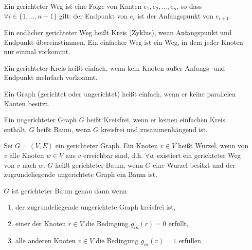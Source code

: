 \begin{definition}
	
	Ein gerichteter Weg ist eine Folge von Kanten $e_1, e_2, \dots, e_n$, so dass $\forall i \in \{ 1, \dots, n-1 \}$ gilt: der Endpunkt von $e_i$ ist der Anfangspunkt von $e_{i+1}$.
	
	Ein endlicher gerichteter Weg heißt Kreis (Zyklus), wenn Anfangspunkt und Endpunkt übereinstimmen. Ein einfacher Weg ist ein Weg, in dem jeder Knoten nur einmal vorkommt.
	
	Ein gerichteter Kreis heißt einfach, wenn kein Knoten außer Anfangs- und Endpunkt mehrfach vorkommt.
\end{definition}


\begin{definition}

	Ein Graph (gerichtet oder ungerichtet) heißt einfach, wenn er keine parallelen Kanten besitzt.
\end{definition}


\begin{definition}
	
	Ein ungerichteter Graph $G$ heißt Kreisfrei, wenn er keinen einfachen Kreis enthält. $G$ heißt Baum, wenn $G$ kreisfrei und zusammenhängend ist.
\end{definition}


\begin{definition}

	Sei $G = (V, E)$ ein gerichteter Graph. Ein Knoten $v \in V$ heißt Wurzel, wenn von $v$ alle Knoten $w \in V$ aus $v$ erreichbar sind, d.h. $\forall w$  existiert ein gerichteter Weg von $v$ nach $w$. $G$ heißt gerichteter Baum, wenn $G$ eine Wurzel besitzt und der zugrundeliegende ungerichtete Graph ein Baum ist.
\end{definition}


\begin{bemerkung}
	$G$ ist gerichteter Baum genau dann wenn
	\begin{enumerate}
		\item der zugrundeliegende ungerichtete Graph kreisfrei ist,
		\item einer der Knoten $r \in V$ die Bedingung $g_{in}(r) = 0$ erfüllt,
		\item alle anderen Knoten $v \in V$ die Bedingung $g_{in}(v) = 1$ erfüllen.
	\end{enumerate}
\end{bemerkung}


